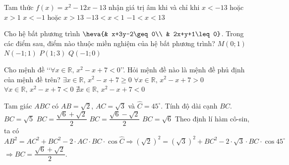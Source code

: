 \begin{ex}%
Tam thức $f(x)=x^2-12x-13$ nhận giá trị âm khi và chỉ khi
\choice
{$x<-13$ hoặc $x>1$}
{$x<-1$ hoặc $x>13$}
{$-13<x<1$}
{\True $-1<x<13$}
\end{ex}

\begin{ex}%
Cho hệ bất phương trình $\heva{& x+3y-2\geq 0\\ & 2x+y+1\leq 0}$. Trong các điểm sau, điểm nào thuộc miền nghiệm của hệ bất phương trình?
\choice
{$M\left(0;1\right)$}
{\True $N\left(-1;1\right)$}
{$P\left(1;3\right)$}
{$Q\left(-1;0\right)$}

\end{ex}

\begin{ex}%
Cho mệnh đề \lq\lq $\forall x\in \mathbb{R},\,x^2-x+7<0$\rq\rq. Hỏi mệnh đề nào là mệnh đề phủ định của mệnh đề trên?
\choice
{\True $\exists x\in \mathbb{R},\,x^2-x+7\ge 0$}
{$\forall x\in \mathbb{R},\,x^2-x+7 > 0$}
{$\forall x\in \mathbb{R},\,x^2-x+7 < 0$}
{$\nexists x\in \mathbb{R},\,x^2-x+7 < 0$}
\end{ex}

\begin{ex}%
Tam giác $ ABC$ có $ AB=\sqrt{2}$, $AC=\sqrt{3}$ và $ \widehat{C}=45^\circ $. Tính độ dài cạnh $ BC$.
\choice
{$ BC=\sqrt{5}$}
{\True $ BC=\dfrac{\sqrt{6}+\sqrt{2}}{2}$}
{$ BC=\dfrac{\sqrt{6}-\sqrt{2}}{2}$}
{$ BC=\sqrt{6}$}
\loigiai
{Theo định lí hàm cô-sin, ta có\\
$ AB^2=AC^2+BC^2-2\cdot AC\cdot BC\cdot \cos \widehat{C}\Rightarrow {(\sqrt{2} )}^2={(\sqrt{3} )}^2+BC^2-2\cdot \sqrt{3}\cdot BC\cdot \cos 45^\circ $ \\
$ \Rightarrow BC=\dfrac{\sqrt{6}+\sqrt{2}}{2}$.}
\end{ex}

